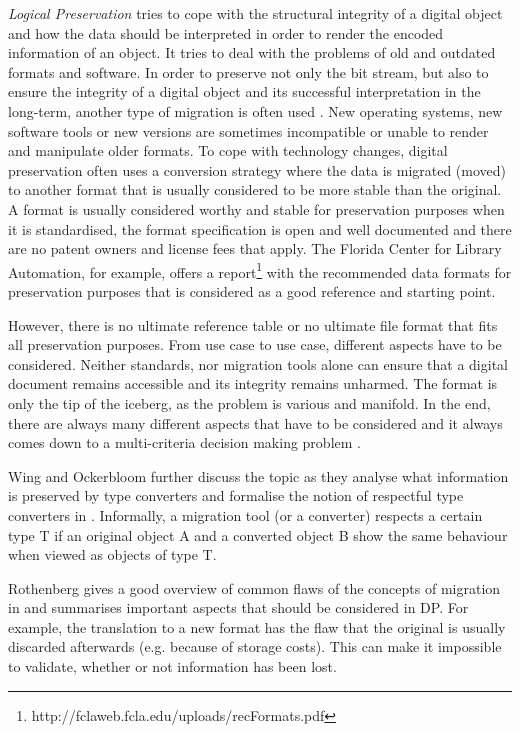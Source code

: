 \textit{Logical Preservation} tries to cope with the structural integrity of a digital object and how the data should be interpreted in order to render the encoded information of an object. It tries to deal with the problems of old and outdated formats and software. In order to preserve not only the bit stream, but also to ensure the integrity of a digital object and its successful interpretation in the long-term, another type of migration is often used \cite{Lee:2002:SOTADP}. New operating systems, new software tools or new versions are sometimes incompatible or unable to render and manipulate older formats. To cope with technology changes, digital preservation often uses a conversion strategy where the data is migrated (moved) to another format that is usually considered to be more stable than the original. A format is usually considered worthy and stable for preservation purposes when it is standardised, the format specification is open and well documented and there are no patent owners and license fees that apply. The Florida Center for Library Automation, for example, offers a report\footnote{http://fclaweb.fcla.edu/uploads/recFormats.pdf} with the recommended data formats for preservation purposes that is considered as a good reference and starting point. 

However, there is no ultimate reference table or no ultimate file format that fits all preservation purposes. From use case to use case, different aspects have to be considered. Neither standards, nor migration tools alone can ensure that a digital document remains accessible and its integrity remains unharmed. The format is only the tip of the iceberg, as the problem is various and manifold. In the end, there are always many different aspects that have to be considered and it always comes down to a multi-criteria decision making problem \cite{becker:decision}.

Wing and Ockerbloom further discuss the topic as they analyse what information is preserved by type converters and formalise the notion of respectful type converters in \cite{859529}. Informally, a migration tool (or a converter) respects a certain type T if an original object A and a converted object B show the same behaviour when viewed as objects of type T.

Rothenberg gives a good overview of common flaws of the concepts of migration in \cite{rothenberg:1999:ensuring} and summarises important aspects that should be considered in DP. For example, the translation to a new format has the flaw that the original is usually discarded afterwards (e.g. because of storage costs). This can make it impossible to validate, whether or not information has been lost.

